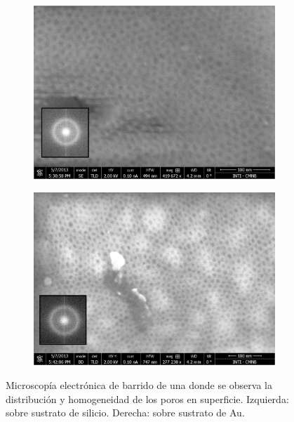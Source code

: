 			\begin{figure}[th]
		 	   	    \begin{subfigure}[t]{0.49\textwidth}
			        	\includegraphics[width=\textwidth]{Imagenes/F127_Si_sup.jpg}
			       		\end{subfigure}
					\begin{subfigure}[t]{0.49\textwidth}
			 	   	    \includegraphics[width=\textwidth]{Imagenes/F127_Au_sup.jpg}
			       		\end{subfigure}
					\caption[SEM arreglo poroso sobre Si y Au.]{Microscopía electrónica de barrido de una \pdmF\space donde se observa la distribución y homogeneidad de los poros en superficie. Izquierda: sobre sustrato de silicio. Derecha: sobre sustrato de Au.}	 
					 \label{fig:F127_Si_Au}
					 \end{figure}

